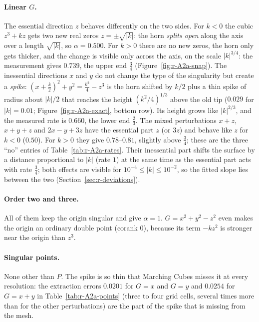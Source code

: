 \documentclass[12pt, a4paper]{article}
\theoremstyle{plain}
\theoremstyle{definition}
\theoremstyle{remark}
\theoremstyle{definition}
\begin{document}
\paragraph{Linear $G$.} The essential direction $z$ behaves differently on the two
sides. For $k<0$ the cubic $z^3+kz$ gets two new real zeros $z=\pm\sqrt{|k|}$: the
horn \emph{splits open} along the axis over a length $\sqrt{|k|}$, so $\alpha=0.500$.
For $k>0$ there are no new zeros, the horn only gets thicker, and the change is
visible only across the axis, on the scale $|k|^{3/4}$: the measurement gives
$0.739$, the upper end $\tfrac34$ (Figure~\ref{fig:r-A2a-snap}).
The inessential directions $x$ and $y$ do not change the type of the singularity
but create a \emph{spike}: $(x+\tfrac k2)^2+y^2=\tfrac{k^2}{4}-z^3$ is the horn
shifted by $k/2$ plus a thin spike of radius about $|k|/2$ that reaches the height
$(k^2/4)^{1/3}$ above the old tip ($0.029$ for $|k|=0.01$;
Figure~\ref{fig:r-A2a-exact}, bottom row). Its height grows like $|k|^{2/3}$, and
the measured rate is $0.660$, the lower end $\tfrac23$.
The mixed perturbations $x+z$, $x+y+z$ and $2x-y+3z$ have the essential part $z$
(or $3z$) and behave like $z$ for $k<0$ ($0.50$). For $k>0$ they give $0.78$--$0.81$,
slightly above $\tfrac34$; these are the three ``no'' entries of
Table~\ref{tab:r-A2a-rates}. Their inessential part shifts the surface by a distance
proportional to $|k|$ (rate $1$) at the same time as the essential part acts with
rate $\tfrac34$; both effects are visible for $10^{-4}\le|k|\le10^{-2}$, so the
fitted slope lies between the two (Section~\ref{sec:r-deviations}).

\paragraph{Order two and three.} All of them keep the origin singular and give
$\alpha=1$. $G=x^2+y^2-z^2$ even makes the origin an ordinary double point
(corank $0$), because its term $-kz^2$ is stronger near the origin than $z^3$.

\paragraph{Singular points.} None other than $P$. The spike is so thin that
Marching Cubes misses it at every resolution: the extraction errors $0.0201$ for
$G=x$ and $G=y$ and $0.0254$ for $G=x+y$ in Table~\ref{tab:r-A2a-points} (three to
four grid cells, several times more than for the other perturbations) are the part
of the spike that is missing from the mesh.
\clearpage
\end{document}

